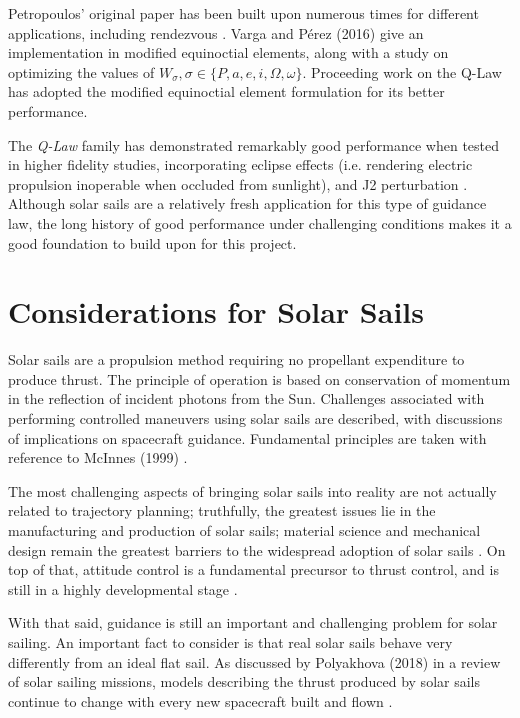 Petropoulos' original paper has been built upon numerous times for different applications, including rendezvous \cite{sanjeev2023}. Varga and Pérez (2016) \cite{vargaperez2016} give an implementation in modified equinoctial elements, along with a study on optimizing the values of \(W_\sigma, \sigma \in \{P, a, e, i, \Omega, \omega\}\). Proceeding work on the Q-Law has adopted the modified equinoctial element formulation \cite{sanjeev2023} for its better performance.

The \textit{Q-Law} family has demonstrated remarkably good performance when tested in higher fidelity studies, incorporating eclipse effects (i.e. rendering electric propulsion inoperable when occluded from sunlight), and J2 perturbation \cite{vargaperez2016}. Although solar sails are a relatively fresh application for this type of guidance law, the long history of good performance under challenging conditions makes it a good foundation to build upon for this project.

\section{Considerations for Solar Sails}
Solar sails are a propulsion method requiring no propellant expenditure to produce thrust. The principle of operation is based on conservation of momentum in the reflection of incident photons from the Sun. Challenges associated with performing controlled maneuvers using solar sails are described, with discussions of implications on spacecraft guidance. Fundamental principles are taken with reference to McInnes (1999) \cite{mcinnes}.

The most challenging aspects of bringing solar sails into reality are not actually related to trajectory planning; truthfully, the greatest issues lie in the manufacturing and production of solar sails; material science and mechanical design remain the greatest barriers to the widespread adoption of solar sails \cite{mcinnes}. On top of that, attitude control is a fundamental precursor to thrust control, and is still in a highly developmental stage \cite{choi2015structural}.

With that said, guidance is still an important and challenging problem for solar sailing. An important fact to consider is that real solar sails behave very differently from an ideal flat sail. As discussed by Polyakhova (2018) in a review of solar sailing missions, models describing the thrust produced by solar sails continue to change with every new spacecraft built and flown \cite{polyakhova2018solar}.

